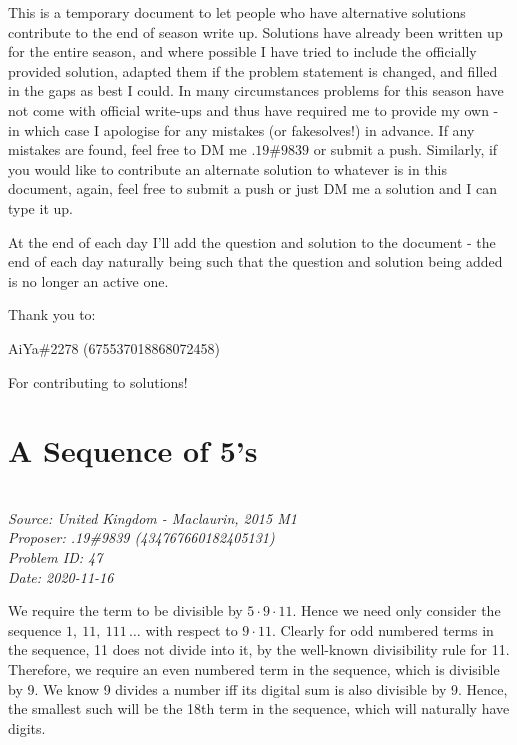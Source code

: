 \documentclass[titlepage=true]{scrartcl}
\def\Paiya{AiYa\#2278 (675537018868072458)}
\begin{document}
\SSfp

This is a temporary document to let people who have alternative solutions contribute to the end of season write up. Solutions have already been written up for the entire season, and where possible I have tried to include the officially provided solution, adapted them if the problem statement is changed, and filled in the gaps as best I could. In many circumstances problems for this season have not come with official write-ups and thus have required me to provide my own - in which case I apologise for any mistakes (or fakesolves!) in advance. If any mistakes are found, feel free to DM me \(.19\#9839\) or submit a push. Similarly, if you would like to contribute an alternate solution to whatever is in this document, again, feel free to submit a push or just DM me a solution and I can type it up.\medskip
 
At the end of each day I'll add the question and solution to the document - the end of each day naturally being such that the question and solution being added is no longer an active one.\bigskip

Thank you to:\medskip

\Paiya\medskip

For contributing to solutions! 

\newpage
    
\section{A Sequence of 5's}

    \SSbreak\\
    \emph{Source: United Kingdom - Maclaurin, 2015 M1}\\
    \emph{Proposer: .19\#9839 (434767660182405131)}\\
    \emph{Problem ID: 47}\\
    \emph{Date: 2020-11-16}\\
    \SSbreak
        
    \bigskip

    \begin{solution}\hfil\medskip

        We require the term to be divisible by \(5\cdot9\cdot 11\). Hence we need only consider the sequence \(1,\ 11,\ 111\,\ldots\) with respect to \(9\cdot11\). Clearly for odd numbered terms in the sequence, 11 does not divide into it, by the well-known divisibility rule for 11. Therefore, we require an even numbered term in the sequence, which is divisible by 9. We know 9 divides a number iff its digital sum is also divisible by 9. Hence, the smallest such will be the 18th term in the sequence, which will naturally have  digits. 
    \end{solution}\bigskip
\end{document}
